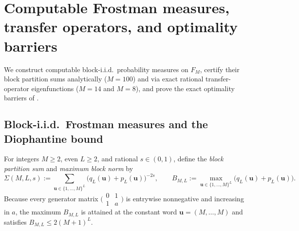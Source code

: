 \documentclass[11pt]{article}
\begin{document}
\section{Computable Frostman measures, transfer operators, and optimality barriers}\label{sec:measures}

We construct computable block-i.i.d.\ probability measures on $F_M$, certify their block partition sums analytically ($M=100$) and via exact rational transfer-operator eigenfunctions ($M=14$ and $M=8$), and prove the exact optimality barriers of .

\subsection{Block-i.i.d.\ Frostman measures and the Diophantine bound}

For integers $M\ge2$, even $L\ge2$, and rational $s\in(0,1)$, define the \emph{block partition sum} and \emph{maximum block norm} by
\begin{equation}\label{eq:sigma-def}
\Sigma(M,L,s):=\sum_{\mathbf{u}\in\{1,\dots,M\}^L}\bigl(q_L(\mathbf{u})+p_L(\mathbf{u})\bigr)^{-2s},\qquad
B_{M,L}:=\max_{\mathbf{u}\in\{1,\dots,M\}^L}\bigl(q_L(\mathbf{u})+p_L(\mathbf{u})\bigr).
\end{equation}
Because every generator matrix $\bigl(\begin{smallmatrix}0&1\\1&a\end{smallmatrix}\bigr)$ is entrywise nonnegative and increasing in $a$, the maximum $B_{M,L}$ is attained at the constant word $\mathbf{u}=(M,\dots,M)$ and satisfies $B_{M,L}\le 2(M+1)^L$.
\end{document}
